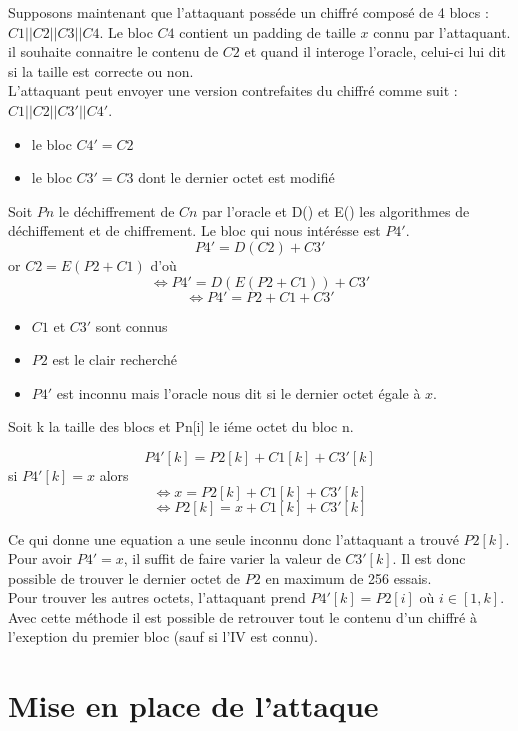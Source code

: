 Supposons maintenant que l'attaquant posséde un chiffré composé de 4 blocs :
$C1||C2||C3||C4$. Le bloc $C4$ contient un padding de taille $x$ connu par l'attaquant.
il souhaite connaitre le contenu de $C2$ et quand il interoge l'oracle, celui-ci lui dit
si la taille est correcte ou non.\\
L'attaquant peut envoyer une version contrefaites du chiffré comme suit :
$C1||C2||C3'||C4'$.\\
\begin{itemize}
\item le bloc $C4'=C2$
\item le bloc $C3'= C3$ dont le dernier octet est modifié
\end{itemize}
Soit $Pn$ le déchiffrement de $Cn$ par l'oracle et D() et E() les algorithmes
de déchiffement et de chiffrement. 
Le bloc qui nous intérésse est $P4'$.
\[P4' = D(C2) + C3'\]
or $C2 = E(P2 + C1)$ d'où
\[\Longleftrightarrow P4' = D(E(P2 + C1)) + C3'\]
\[\Longleftrightarrow P4' = P2 + C1 + C3'\]
\begin{itemize}
\item $C1$ et $C3'$ sont connus
\item $P2$ est le clair recherché
\item $P4'$ est inconnu mais l'oracle nous dit si le dernier octet égale à $x$.
\end{itemize}
Soit k la taille des blocs et Pn[i] le iéme octet du bloc n.

\[P4'[k] = P2[k] + C1[k] + C3'[k]\] si $P4'[k] = x$ alors
\[\Longleftrightarrow x = P2[k] + C1[k] + C3'[k]\]
\[\Longleftrightarrow P2[k] = x + C1[k] + C3'[k]\]

Ce qui donne une equation a une seule inconnu donc l'attaquant a trouvé $P2[k]$.
Pour avoir $P4' = x$, il suffit de faire varier la valeur de $C3'[k]$. Il est donc
possible de trouver le dernier octet de $P2$ en maximum de 256 essais.\\

Pour trouver les autres octets, l'attaquant prend $P4'[k] = P2[i]$ où $i \in [1,k]$.
Avec cette méthode il est possible de retrouver tout le contenu d'un chiffré à
l'exeption du premier bloc (sauf si l'IV est connu).

\chapter{Mise en place de l'attaque}
\label{chapter:Poodleattack}


